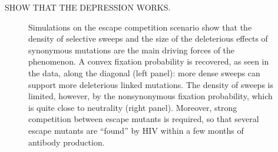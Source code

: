 \documentclass[rmp, twocolumn]{revtex4}
\begin{document}
SHOW THAT THE DEPRESSION WORKS.

\begin{figure}
\begin{center}
\caption{Simulations on the escape competition scenario show that the density of
 selective sweeps and the size of the deleterious effects of synonymous
 mutations are the main driving forces of the phenomenon. A convex fixation
 probability is recovered, as seen in the data, along the diagonal (left panel):
 more dense sweeps can support more deleterious linked mutations. The density of
 sweeps is limited, however, by the nonsynonymous fixation probability, which is
 quite close to neutrality (right panel). Moreover, strong competition between
 escape mutants is required, so that several escape mutants are ``found'' by HIV
within a few months of antibody production.}
\label{fig:simheat}
\end{center}
\end{figure}
\end{document}
